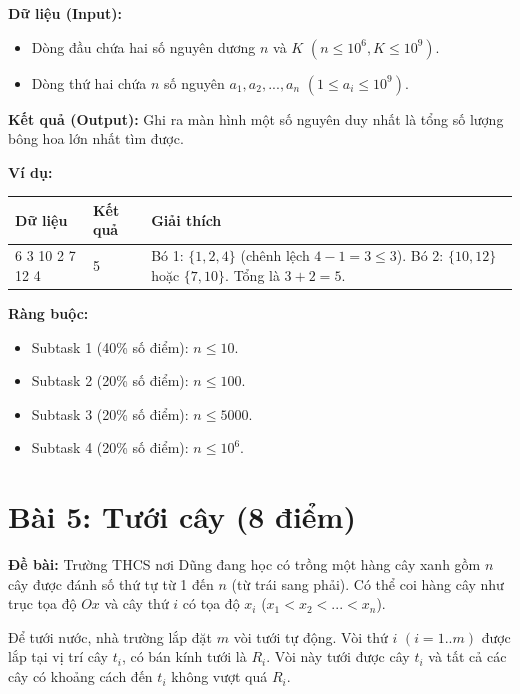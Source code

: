 \documentclass[11pt, a4paper]{article}
\begin{document}
\textbf{Dữ liệu (Input):}
\begin{itemize}
    \item Dòng đầu chứa hai số nguyên dương $n$ và $K$ $(n \le 10^{6}, K \le 10^{9})$.
    \item Dòng thứ hai chứa $n$ số nguyên $a_{1},a_{2},...,a_{n}$ $(1 \le a_{i} \le 10^{9})$.
\end{itemize}

\textbf{Kết quả (Output):} Ghi ra màn hình một số nguyên duy nhất là tổng số lượng bông hoa lớn nhất tìm được.

\textbf{Ví dụ:}
\begin{center}
    \begin{tabularx}{0.9\textwidth}{|p{5cm}|X|X|}
        \hline
        \textbf{Dữ liệu} & \textbf{Kết quả} & \textbf{Giải thích} \\
        \hline
        6 3 \newline 1 10 2 7 12 4 & 5 & Bó 1: $\{1,2,4\}$ (chênh lệch $4-1=3 \le 3$). \newline Bó 2: $\{10, 12\}$ hoặc $\{7, 10\}$. \newline Tổng là $3+2=5$. \\
        \hline
    \end{tabularx}
\end{center}

\textbf{Ràng buộc:}
\begin{itemize}
    \item Subtask 1 (40\% số điểm): $n \le 10$.
    \item Subtask 2 (20\% số điểm): $n \le 100$.
    \item Subtask 3 (20\% số điểm): $n \le 5000$.
    \item Subtask 4 (20\% số điểm): $n \le 10^{6}$.
\end{itemize}

\newpage

\section*{Bài 5: Tưới cây (8 điểm)}

\textbf{Đề bài:}
Trường THCS nơi Dũng đang học có trồng một hàng cây xanh gồm $n$ cây được đánh số thứ tự từ 1 đến $n$ (từ trái sang phải). Có thể coi hàng cây như trục tọa độ $Ox$ và cây thứ $i$ có tọa độ $x_{i}$ ($x_{1}<x_{2}<...<x_{n}$).

Để tưới nước, nhà trường lắp đặt $m$ vòi tưới tự động. Vòi thứ $i$ $(i=1..m)$ được lắp tại vị trí cây $t_{i}$, có bán kính tưới là $R_{i}$. Vòi này tưới được cây $t_{i}$ và tất cả các cây có khoảng cách đến $t_{i}$ không vượt quá $R_{i}$.
\end{document}
